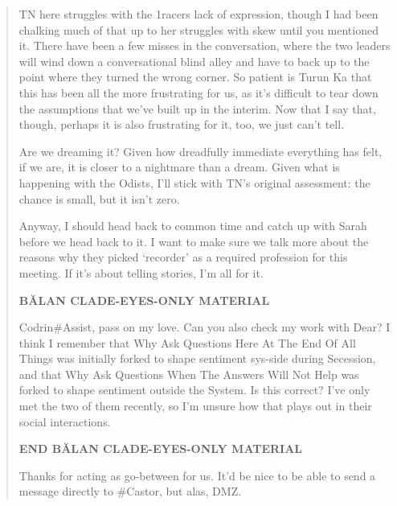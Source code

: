 \begin{quote}
TN here struggles with the 1racers lack of expression, though I had been chalking much of that up to her struggles with skew until you mentioned it. There have been a few misses in the conversation, where the two leaders will wind down a conversational blind alley and have to back up to the point where they turned the wrong corner. So patient is Turun Ka that this has been all the more frustrating for us, as it's difficult to tear down the assumptions that we've built up in the interim. Now that I say that, though, perhaps it is also frustrating for it, too, we just can't tell.

Are we dreaming it? Given how dreadfully immediate everything has felt, if we are, it is closer to a nightmare than a dream. Given what is happening with the Odists, I'll stick with TN's original assessment: the chance is small, but it isn't zero.

Anyway, I should head back to common time and catch up with Sarah before we head back to it. I want to make sure we talk more about the reasons why they picked `recorder' as a required profession for this meeting. If it's about telling stories, I'm all for it.

\textbf{BĂLAN CLADE-EYES-ONLY MATERIAL}

Codrin\#Assist, pass on my love. Can you also check my work with Dear? I think I remember that Why Ask Questions Here At The End Of All Things was initially forked to shape sentiment sys-side during Secession, and that Why Ask Questions When The Answers Will Not Help was forked to shape sentiment outside the System. Is this correct? I've only met the two of them recently, so I'm unsure how that plays out in their social interactions.

\textbf{END BĂLAN CLADE-EYES-ONLY MATERIAL}

Thanks for acting as go-between for us. It'd be nice to be able to send a message directly to \#Castor, but alas, DMZ.
\end{quote}
